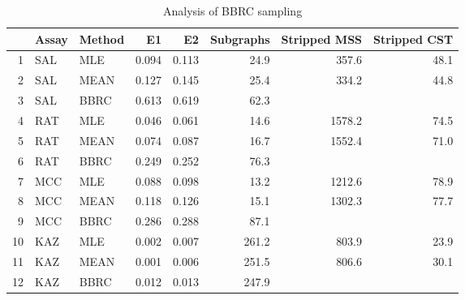 \begin{table}[t]
\begin{center}
\begin{tabular}{rllrrrrr}
  \hline
 & Assay & Method & E1 & E2 & Subgraphs & Stripped MSS & Stripped CST \\ 
  \hline
1 & SAL & MLE & 0.094 & 0.113 & 24.9 & 357.6 & 48.1 \\ 
  2 & SAL & MEAN & 0.127 & 0.145 & 25.4 & 334.2 & 44.8 \\ 
  3 & SAL & BBRC & 0.613 & 0.619 & 62.3 &  &  \\ 
  4 & RAT & MLE & 0.046 & 0.061 & 14.6 & 1578.2 & 74.5 \\ 
  5 & RAT & MEAN & 0.074 & 0.087 & 16.7 & 1552.4 & 71.0 \\ 
  6 & RAT & BBRC & 0.249 & 0.252 & 76.3 &  &  \\ 
  7 & MCC & MLE & 0.088 & 0.098 & 13.2 & 1212.6 & 78.9 \\ 
  8 & MCC & MEAN & 0.118 & 0.126 & 15.1 & 1302.3 & 77.7 \\ 
  9 & MCC & BBRC & 0.286 & 0.288 & 87.1 &  &  \\ 
  10 & KAZ & MLE & 0.002 & 0.007 & 261.2 & 803.9 & 23.9 \\ 
  11 & KAZ & MEAN & 0.001 & 0.006 & 251.5 & 806.6 & 30.1 \\ 
  12 & KAZ & BBRC & 0.012 & 0.013 & 247.9 &  &  \\ 
   \hline
\end{tabular}
\caption{Analysis of BBRC sampling}
\label{t:anal}
\end{center}
\end{table}
